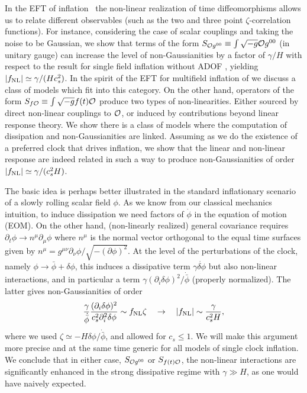 \documentclass[11pt,amsmath,floats,floatfix,nofootinbib,secnumarabic, superscriptaddress, tightenlines]{revtex4}
\newcommand{\beq}{\begin{equation}}
\newcommand{\eeq}{\end{equation}}
\newcommand{\calo}{{\cal O}}
\newcommand{\bphi}{{\bar\phi}}
\begin{document}
In the EFT of inflation~\cite{eft1} the non-linear realization of time diffeomorphisms allows us to relate different observables (such as the two and three point $\zeta$-correlation functions). For instance, considering the case of scalar couplings and taking the noise to be Gaussian, we show that terms of the form $S_{\calo g^{00}} \equiv \int \sqrt{-g}\calo g^{00}$ (in unitary gauge) can increase the level of non-Gaussianities by a factor of  $\gamma/H$ with respect to the result for single field inflation without ADOF \cite{eft1}, yielding $|f_{\rm NL}| \simeq \gamma/(Hc_s^2)$. In the spirit of the EFT for multifield inflation of \cite{multieft} we discuss a class of models which fit into this category.
On the other hand, operators of the form $S_{f\calo}\equiv \int \sqrt{-g} f(t)\calo$ produce two types of non-linearities. Either sourced by direct non-linear couplings to $\calo$, or induced by contributions beyond linear response theory. We show there is a class of models where the computation of dissipation and non-Gaussianities are linked. Assuming as we do the existence of a preferred clock that drives inflation, we show that the linear and non-linear response are indeed related in such a way to produce non-Gaussianities of order $|f_{\rm NL}| \simeq \gamma/(c_s^2H)$.

The basic idea is perhaps better illustrated in the standard inflationary scenario of a slowly rolling scalar field  $\phi$. As we know from our classical mechanics intuition, to induce dissipation we need factors of $\dot\phi$ in the equation of motion (EOM). On the other hand, (non-linearly realized) general covariance requires $\partial_t\phi \to n^\mu \partial_\mu \phi$ where $n^\mu$ is the normal vector orthogonal to the equal time surfaces given by $n^\mu = g^{\mu\nu}\partial_\nu \phi/\sqrt{-(\partial\phi)^2}$. At the level of the perturbations of the clock, namely $\phi \to \bphi + \delta\phi$, this induces a dissipative term $\gamma\dot{\delta\phi}$ but also non-linear interactions, and in particular a term $\gamma (\partial_i\delta\phi)^2/\dot\bphi$ (properly normalized). The latter gives non-Gaussianities of order
\beq \frac{\gamma}{\dot\bphi}\frac{(\partial_i \delta\phi)^2}{c_s^2\partial_i^2\delta\phi} \sim f_{\rm NL}\zeta \quad \to \quad |f_{\rm NL}| \sim \frac{\gamma}{c_s^2 H},\eeq
where we used $\zeta \simeq -H\delta\phi/\dot\bphi$, and allowed for $c_s \leq 1$.  We will make this argument more precise and at the same time generic for all models of single clock inflation. We conclude that in either case, $S_{\calo g^{00}}$ or $S_{f(t)\calo}$, the non-linear interactions are significantly enhanced in the strong dissipative regime with $\gamma \gg H$, as one would have naively expected.
\end{document}
